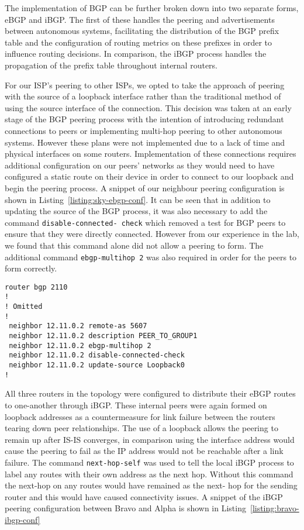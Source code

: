 The implementation of BGP can be further broken down into two separate forms,
eBGP and iBGP. The first of these handles the peering and advertisements
between autonomous systems, facilitating the distribution of the BGP prefix
table and the configuration of routing metrics on these prefixes in order to
influence routing decisions. In comparison, the iBGP process handles the
propagation of the prefix table throughout internal routers.

For our ISP's peering to other ISPs, we opted to take the approach of peering
with the source of a loopback interface rather than the traditional method of
using the source interface of the connection. This decision was taken at an
early stage of the BGP peering process with the intention of introducing
redundant connections to peers or implementing multi-hop peering to other
autonomous systems. However these plans were not implemented due to a lack of
time and physical interfaces on some routers. Implementation of these
connections requires additional configuration on our peers' networks
as they would need to have configured a static route on their device in order
to connect to our loopback and begin the peering process. A snippet of our
neighbour peering configuration is shown in Listing~\ref{listing:sky-ebgp-conf}.
It can be seen that in addition to updating the source of the BGP
process, it was also necessary to add the command \texttt{disable-connected-
check} which removed a test for BGP peers to ensure that they were directly
connected. However from our experience in the lab, we found that this command
alone did not allow a peering to form. The additional command \texttt{ebgp-multihop 2}
was also required in order for the peers to form correctly.

\begin{lstlisting}[caption={BT-Sky eBGP Configuration}, label={listing:sky-ebgp-conf}]
router bgp 2110
!
! Omitted
!
 neighbor 12.11.0.2 remote-as 5607
 neighbor 12.11.0.2 description PEER_TO_GROUP1
 neighbor 12.11.0.2 ebgp-multihop 2
 neighbor 12.11.0.2 disable-connected-check
 neighbor 12.11.0.2 update-source Loopback0
!
\end{lstlisting}

All three routers in the topology were configured to distribute their eBGP
routes to one-another through iBGP. These internal peers were again formed on
loopback addresses as a countermeasure for link failure between the routers
tearing down peer relationships. The use of a loopback allows the peering to
remain up after IS-IS converges, in comparison using the interface address
would cause the peering to fail as the IP address would not be reachable after
a link failure. The command \texttt{next-hop-self} was used to tell the local
iBGP process to label any routes with their own address as the next hop.
Without this command the next-hop on any routes would have remained as the next-
hop for the sending router and this would have caused connectivity issues. A
snippet of the iBGP peering configuration between Bravo and Alpha is shown in
Listing~\ref{listing:bravo-ibgp-conf}

